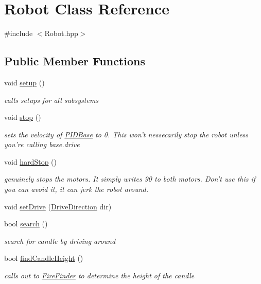 \hypertarget{classRobot}{\section{Robot Class Reference}
\label{classRobot}
}


{\ttfamily \#include $<$Robot.\-hpp$>$}

\subsection*{Public Member Functions}
\begin{DoxyCompactItemize}
\item 
void \hyperlink{classRobot_a1fc37e3c329d59795f6adf44199d4df9}{setup} ()
\begin{DoxyCompactList}\small\item\em calls setups for all subsystems \end{DoxyCompactList}\item 
void \hyperlink{classRobot_a14dfe126ae973d3b9f81fee81a06ac22}{stop} ()
\begin{DoxyCompactList}\small\item\em sets the velocity of \hyperlink{classPIDBase}{P\-I\-D\-Base} to 0. This won't nessecarily stop the robot unless you're calling base.\-drive \end{DoxyCompactList}\item 
void \hyperlink{classRobot_a5d21e8314db61586ed66637baac6063a}{hard\-Stop} ()
\begin{DoxyCompactList}\small\item\em genuinely stops the motors. It simply writes 90 to both motors. Don't use this if you can avoid it, it can jerk the robot around. \end{DoxyCompactList}\item 
void \hyperlink{classRobot_ade0935cead03791f27fa854df88a3f22}{set\-Drive} (\hyperlink{DriveMotor_8hpp_a077d9d13989efa3142086ea83cbb1e68}{Drive\-Direction} dir)
\item 
bool \hyperlink{classRobot_a1f08dec6eea6b51d73cd41a8db3bb893}{search} ()
\begin{DoxyCompactList}\small\item\em search for candle by driving around \end{DoxyCompactList}\item 
bool \hyperlink{classRobot_a17e0de9c529197b3575e11a87470376b}{find\-Candle\-Height} ()
\begin{DoxyCompactList}\small\item\em calls out to \hyperlink{classFireFinder}{Fire\-Finder} to determine the height of the candle \end{DoxyCompactList}\item 

\end{DoxyCompactItemize}
